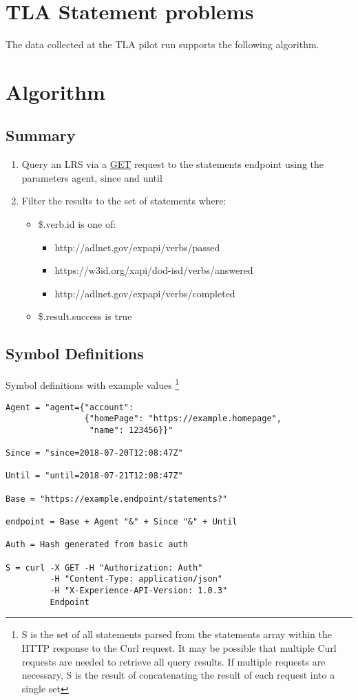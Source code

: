 \documentclass{article}
\begin{document}
\section{TLA Statement problems}
The data collected at the TLA pilot run supports the following algorithm.
\section{Algorithm}
\subsection{Summary}
\begin{enumerate}
  \item Query an LRS via a \href{https://github.com/adlnet/xAPI-Spec/blob/master/xAPI-Communication.md#213-get-statements}{GET} request to the statements endpoint using the parameters agent, since and until
  \item Filter the results to the set of statements where:
    \begin{itemize}
    \item \$.verb.id is one of:
      \begin{itemize}
      \item http://adlnet.gov/expapi/verbs/passed
      \item https://w3id.org/xapi/dod-isd/verbs/answered
      \item http://adlnet.gov/expapi/verbs/completed
      \end{itemize}
    \item \$.result.success is true
    \end{itemize}
  \end{enumerate}

  \subsection{Symbol Definitions}
  Symbol definitions with example values
  \footnote{\label{moreLink} S is the set of all statements parsed from the statements array within the HTTP response to the Curl request. It may be possible that multiple Curl requests are needed to retrieve all query results. If multiple requests are necessary, S is the result of concatenating the result of each request into a single set}
  \begin{lstlisting}[frame=single]
Agent = "agent={"account":
                {"homePage": "https://example.homepage",
                 "name": 123456}}"

Since = "since=2018-07-20T12:08:47Z"

Until = "until=2018-07-21T12:08:47Z"

Base = "https://example.endpoint/statements?"

endpoint = Base + Agent "&" + Since "&" + Until

Auth = Hash generated from basic auth

S = curl -X GET -H "Authorization: Auth"
         -H "Content-Type: application/json"
         -H "X-Experience-API-Version: 1.0.3"
         Endpoint
  \end{lstlisting}
\end{document}
